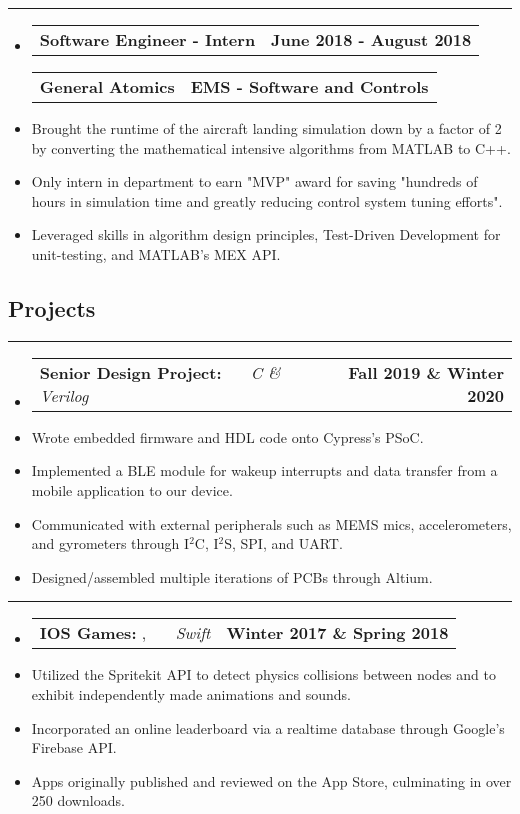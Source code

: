 \documentclass[10pt,letterpaper]{article}
\makeatletter
\newcommand{\header}[2]
{
	\begin{tabular*}{\linewidth}{l @{\extracolsep{\fill}} r}
		\hspace{-27pt} #1 & #2 \\
	\end{tabular*}
}
\newcommand{\sectionbreak}
{
	\vspace{-1.2em}
	\rule{\textwidth}{1.7pt}
	\vspace{-1.7em}
}
\makeatother
\begin{document}
\hrule

\begin{itemize}
	\item[]
		\header
			{\textbf{Software Engineer - Intern}} 
			{\textbf{June 2018 - August 2018}}
		\header
			{\textbf{General Atomics}}
			{\textbf{EMS - Software and Controls}} 
		\item
			Brought the runtime of the aircraft landing simulation down by a factor of 2 by converting the mathematical intensive algorithms from MATLAB to C++. 
		\item
			Only intern in department to earn "MVP" award for saving "hundreds of hours in simulation time and greatly reducing control system tuning efforts".
		\item
			Leveraged skills in algorithm design principles, Test-Driven Development for unit-testing, and MATLAB's MEX API.

\end{itemize}

\vspace{-1.5em}

\subsection*{Projects}
\sectionbreak


\begin{itemize}
	\item[]
		\header
		{
			\textbf{Senior Design Project: }
			\emph{\smash{Smart Dog Collar}} \ \ \ \footnotesize \emph{C \& Verilog}
		}
			{\textbf{Fall 2019 \& Winter 2020}}
		\item 
			Wrote embedded firmware and HDL code onto Cypress's PSoC. 
		\item 
			Implemented a BLE module for wakeup interrupts and data transfer from a mobile application to our device. 
		\item 
			Communicated with external peripherals such as MEMS mics, accelerometers, and gyrometers through I$^{2}$C, I$^{2}$S, SPI, and UART. 
		\item 
			Designed/assembled multiple iterations of PCBs through Altium.

\end{itemize}

\hrule

\begin{itemize}
	\item[]
		\header
		{
			\textbf{IOS Games: }
			\href{https://appadvice.com/app/round-bound/1369632746}{\emph{\underline{\smash{Round 'a Bound}}}}, 
			\href{https://appadvice.com/app/tic-tac-emoji/1346934986}{\emph{\underline{\smash{Tic-Tac Emoji}}}} \ \ \ \footnotesize  \emph{Swift}
		}
			{\textbf{Winter 2017 \& Spring 2018}}
		\item 
			Utilized the Spritekit API to detect physics collisions between nodes and to exhibit independently made animations and sounds.
		\item
			Incorporated an online leaderboard via a realtime database through Google's Firebase API.
		\item
			Apps originally published and reviewed on the App Store, culminating in over 250 downloads.
\end{itemize}
\end{document}
